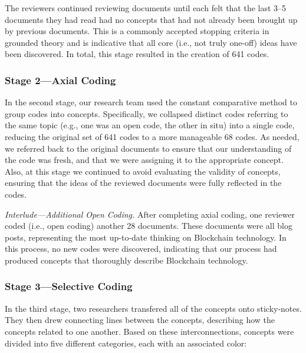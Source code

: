 The reviewers continued reviewing documents until each felt that the last 3--5 documents they had read had no concepts that had not already been brought up by previous documents.
This is a commonly accepted stopping criteria in grounded theory and is indicative that all core (i.e., not truly one-off) ideas have been discovered.
In total, this stage resulted in the creation of 641 codes.

\subsubsection{Stage 2---Axial Coding}
In the second stage, our research team used the constant comparative method to group codes into concepts.
Specifically, we collapsed distinct codes referring to the same topic (e.g., one was an open code, the other in situ) into a single code, reducing the original set of 641 codes to a more manageable 68 codes.
As needed, we referred back to the original documents to ensure that our understanding of the code was fresh, and that we were assigning it to the appropriate concept.
Also, at this stage we continued to avoid evaluating the validity of concepts, ensuring that the ideas of the reviewed documents were fully reflected in the codes.

\textit{Interlude---Additional Open Coding.}
After completing axial coding, one reviewer coded (i.e., open coding) another 28 documents.
These documents were all blog posts, representing the most up-to-date thinking on Blockchain technology.
In this process, no new codes were discovered, indicating that our process had produced concepts that thoroughly describe Blockchain technology.

\subsubsection{Stage 3---Selective Coding}
In the third stage, two researchers transfered all of the concepts onto sticky-notes.
They then drew connecting lines between the concepts, describing how the concepts related to one another.
Based on these interconnections, concepts were divided into five different categories, each with an associated color:

